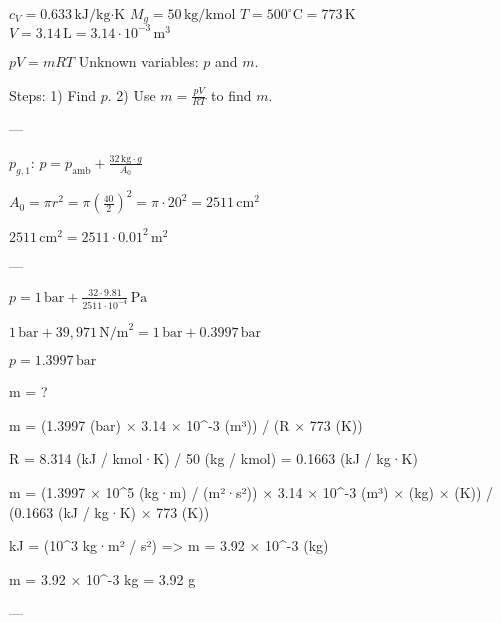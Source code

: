 \( c_V = 0.633 \, \text{kJ/kg·K} \)  
\( M_g = 50 \, \text{kg/kmol} \)  
\( T = 500^\circ \text{C} = 773 \, \text{K} \)  
\( V = 3.14 \, \text{L} = 3.14 \cdot 10^{-3} \, \text{m}^3 \)  

\( pV = mRT \)  
Unknown variables: \( p \) and \( m \).  

Steps:  
1) Find \( p \).  
2) Use \( m = \frac{pV}{RT} \) to find \( m \).  

---

\( p_{g,1} \):  
\( p = p_{\text{amb}} + \frac{32 \, \text{kg} \cdot g}{A_0} \)  

\( A_0 = \pi r^2 = \pi \left( \frac{40}{2} \right)^2 = \pi \cdot 20^2 = 2511 \, \text{cm}^2 \)  

\( 2511 \, \text{cm}^2 = 2511 \cdot 0.01^2 \, \text{m}^2 \)  

---

\( p = 1 \, \text{bar} + \frac{32 \cdot 9.81}{2511 \cdot 10^{-4}} \, \text{Pa} \)  

\( 1 \, \text{bar} + 39,971 \, \text{N/m}^2 = 1 \, \text{bar} + 0.3997 \, \text{bar} \)  

\( p = 1.3997 \, \text{bar} \)

m = ?  

m = (1.3997 (bar) × 3.14 × 10^-3 (m³)) / (R × 773 (K))  

R = 8.314 (kJ / kmol·K) / 50 (kg / kmol) = 0.1663 (kJ / kg·K)  

m = (1.3997 × 10^5 (kg·m) / (m²·s²)) × 3.14 × 10^-3 (m³) × (kg) × (K)) / (0.1663 (kJ / kg·K) × 773 (K))  

kJ = (10^3 kg·m² / s²)  
=> m = 3.92 × 10^-3 (kg)  

m = 3.92 × 10^-3 kg = 3.92 g  

---